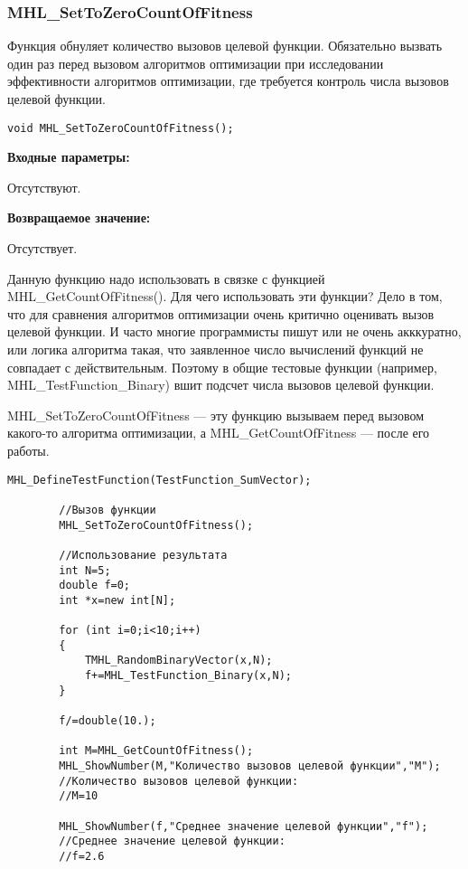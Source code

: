 \documentclass[a4paper,12pt]{article}
\begin{document}
\subsubsection{MHL\_SetToZeroCountOfFitness}\label{MHL_SetToZeroCountOfFitness}

Функция обнуляет количество вызовов целевой функции. Обязательно вызвать один раз перед вызовом алгоритмов оптимизации при исследовании эффективности    алгоритмов оптимизации, где требуется контроль числа вызовов целевой функции.


\begin{lstlisting}[label=code_syntax_MHL_SetToZeroCountOfFitness,caption=Синтаксис]
void MHL_SetToZeroCountOfFitness();
\end{lstlisting}

\textbf{Входные параметры:}

Отсутствуют.

\textbf{Возвращаемое значение:}
 
Отсутствует.

Данную функцию надо использовать в связке с функцией MHL\_GetCountOfFitness(). Для чего использовать эти функции? Дело в том, что для сравнения алгоритмов оптимизации очень критично оценивать вызов целевой функции. И часто многие программисты пишут или не очень акккуратно, или логика алгоритма такая, что заявленное число вычислений функций не совпадает с действительным. Поэтому в общие тестовые функции (например, MHL\_TestFunction\_Binary) вшит подсчет числа вызовов целевой функции.

MHL\_SetToZeroCountOfFitness --- эту функцию вызываем перед вызовом какого-то алгоритма оптимизации, а MHL\_GetCountOfFitness --- после его работы.


\begin{lstlisting}[label=code_use_MHL_SetToZeroCountOfFitness,caption=Пример использования]
        MHL_DefineTestFunction(TestFunction_SumVector);

        //Вызов функции
        MHL_SetToZeroCountOfFitness();

        //Использование результата
        int N=5;
        double f=0;
        int *x=new int[N];

        for (int i=0;i<10;i++)
        {
            TMHL_RandomBinaryVector(x,N);
            f+=MHL_TestFunction_Binary(x,N);
        }

        f/=double(10.);

        int M=MHL_GetCountOfFitness();
        MHL_ShowNumber(M,"Количество вызовов целевой функции","M");
        //Количество вызовов целевой функции:
        //M=10

        MHL_ShowNumber(f,"Среднее значение целевой функции","f");
        //Среднее значение целевой функции:
        //f=2.6
\end{lstlisting}
\end{document}
